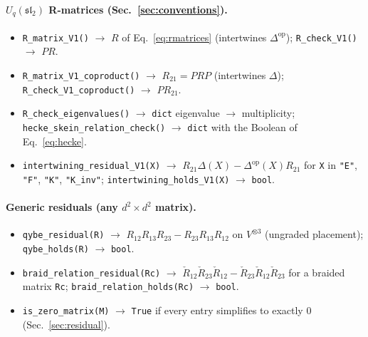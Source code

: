 \documentclass{SciPost}
\newcommand{\Uq}{U_q(\mathfrak{sl}_2)}
\begin{document}
\begin{appendix}
\paragraph{\texorpdfstring{$\Uq$}{Uq(sl2)} R-matrices (Sec.~\ref{sec:conventions}).}
\begin{itemize}\setlength{\itemsep}{1pt}\setlength{\parskip}{0pt}
\item \texttt{R\_matrix\_V1()} $\to$ $R$ of Eq.~\eqref{eq:rmatrices} (intertwines $\Delta^{\mathrm{op}}$); \texttt{R\_check\_V1()} $\to$ $PR$.
\item \texttt{R\_matrix\_V1\_coproduct()} $\to$ $R_{21}=PRP$ (intertwines $\Delta$); \texttt{R\_check\_V1\_coproduct()} $\to$ $PR_{21}$.
\item \texttt{R\_check\_eigenvalues()} $\to$ \texttt{dict} eigenvalue $\to$ multiplicity; \texttt{hecke\_skein\_relation\_check()} $\to$ \texttt{dict} with the Boolean of Eq.~\eqref{eq:hecke}.
\item \texttt{intertwining\_residual\_V1(X)} $\to$ $R_{21}\Delta(X)-\Delta^{\mathrm{op}}(X)R_{21}$ for \texttt{X} in \texttt{"E"}, \texttt{"F"}, \texttt{"K"}, \texttt{"K\_inv"}; \texttt{intertwining\_holds\_V1(X)} $\to$ \texttt{bool}.
\end{itemize}

\paragraph{Generic residuals (any $d^2\times d^2$ matrix).}
\begin{itemize}\setlength{\itemsep}{1pt}\setlength{\parskip}{0pt}
\item \texttt{qybe\_residual(R)} $\to$ $R_{12}R_{13}R_{23}-R_{23}R_{13}R_{12}$ on $V^{\otimes3}$ (ungraded placement); \texttt{qybe\_holds(R)} $\to$ \texttt{bool}.
\item \texttt{braid\_relation\_residual(Rc)} $\to$ $\check R_{12}\check R_{23}\check R_{12}-\check R_{23}\check R_{12}\check R_{23}$ for a braided matrix \texttt{Rc}; \texttt{braid\_relation\_holds(Rc)} $\to$ \texttt{bool}.
\item \texttt{is\_zero\_matrix(M)} $\to$ \texttt{True} if every entry simplifies to exactly 0 (Sec.~\ref{sec:residual}).
\end{itemize}


\end{appendix}
\end{document}
